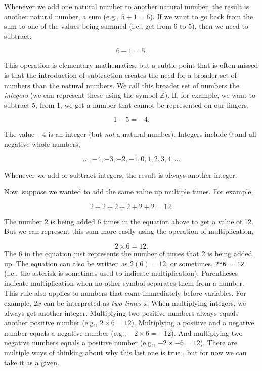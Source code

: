 \documentclass[
]{scrbook}
\begin{document}
Whenever we add one natural number to another natural number, the result is another natural number, a sum (e.g., \(5 + 1 = 6\)).
If we want to go back from the sum to one of the values being summed (i.e., get from \(6\) to \(5\)), then we need to subtract,

\[6 - 1 = 5.\]

This operation is elementary mathematics, but a subtle point that is often missed is that the introduction of subtraction creates the need for a broader set of numbers than the natural numbers.
We call this broader set of numbers the \emph{integers} (we can represent these using the symbol \(\mathbb{Z}\)).
If, for example, we want to subtract 5, from 1, we get a number that cannot be represented on our fingers,

\[1 - 5 = -4.\]

The value \(-4\) is an integer (but \emph{not} a natural number).
Integers include 0 and all negative whole numbers,

\[..., -4, -3, -2, -1, 0, 1, 2, 3, 4,  ...\]

Whenever we add or subtract integers, the result is always another integer.

Now, suppose we wanted to add the same value up multiple times.
For example,

\[2 + 2 + 2 + 2 + 2 + 2 = 12.\]

The number 2 is being added 6 times in the equation above to get a value of 12.
But we can represent this sum more easily using the operation of multiplication,

\[2 \times 6 = 12.\]
The 6 in the equation just represents the number of times that 2 is being added up.
The equation can also be written as \(2(6) = 12\), or sometimes, \texttt{2*6\ =\ 12} (i.e., the asterisk is sometimes used to indicate multiplication).
Parentheses indicate multiplication when no other symbol separates them from a number.
This rule also applies to numbers that come immediately before variables.
For example, \(2x\) can be interpreted as \emph{two times x}.
When multiplying integers, we always get another integer.
Multiplying two positive numbers always equals another positive number (e.g., \(2 \times 6 = 12\)).
Multiplying a positive and a negative number equals a negative number (e.g., \(-2 \times 6 = -12\)).
And multiplying two negative numbers equals a positive number (e.g., \(-2 \times -6 = 12\)).
There are multiple ways of thinking about why this last one is true \citep[see, e.g.,][ for one explanation]{Askey1999}, but for now we can take it as a given.
\end{document}
